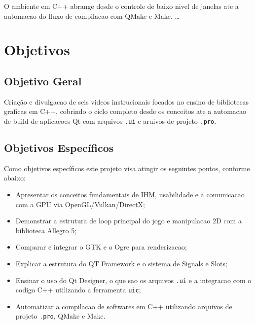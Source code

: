 \documentclass[a4paper,12pt]{article} %
\begin{document}
O ambiente em C++ abrange desde o controle de baixo nivel de janelas ate a automacao do fluxo de compilacao com QMake e Make. \ldots

\section{Objetivos}

\subsection{Objetivo Geral}


Criação e divulgacao de seis videos instrucionais focados no ensino de bibliotecas graficas em C++, cobrindo o ciclo completo desde os conceitos ate a automacao de build de aplicacoes Qt com arquivos \texttt{.ui} e aruivos de projeto \texttt{.pro}.

\subsection{Objetivos Específicos}


Como objetivos específicos este projeto visa atingir os seguintes pontos, conforme abaixo:

\begin{itemize}
    \item Apresentar os conceitos fundamentais de IHM, usabilidade e a comunicacao com a GPU via OpenGL/Vulkan/DirectX;
    \item Demonstrar a estrutura de loop principal do jogo e manipulacao 2D com a biblioteca Allegro 5;
    \item Comparar e integrar o GTK e o Ogre para renderizacao;
    \item Explicar a estrutura do QT Framework e o sistema de Signals e Slots;
    \item Ensinar o uso do Qt Designer, o que sao os arquivos \texttt{.ui} e a integracao com o codigo C++ utilizando a ferramenta \texttt{uic};
    \item Automatizar a compilacao de softwares em C++ utilizando arquivos de projeto \texttt{.pro}, QMake e Make.
\end{itemize}
\end{document}
